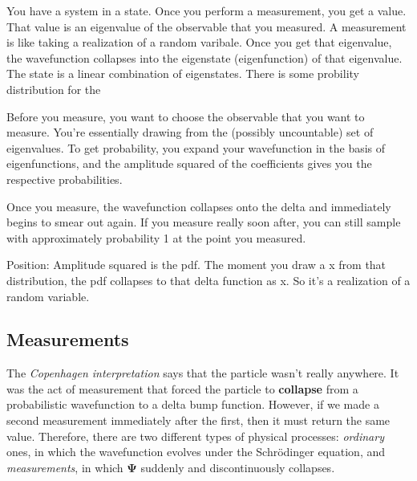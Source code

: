 \documentclass{article}
\theoremstyle{definition}
\begin{document}
      You have a system in a state. Once you perform a measurement, you get a value. That value is an eigenvalue of the observable that you measured. A measurement is like taking a realization of a random varibale. Once you get that eigenvalue, the wavefunction collapses into the eigenstate (eigenfunction) of that eigenvalue. The state is a linear combination of eigenstates. There is some probility distribution for the 

      Before you measure, you want to choose the observable that you want to measure. You're essentially drawing from the (possibly uncountable) set of eigenvalues. To get probability, you expand your wavefunction in the basis of eigenfunctions, and the amplitude squared of the  coefficients gives you the respective probabilities. 

      Once you measure, the wavefunction collapses onto the delta and immediately begins to smear out again. If you measure really soon after, you can still sample with approximately probability 1 at the point you measured. 

      Position: Amplitude squared is the pdf. The moment you draw a x from that distribution, the pdf collapses to that delta function as x. So it's a realization of a random variable. 
      

  \subsection{Measurements}

  The \textit{Copenhagen interpretation} says that the particle wasn't really anywhere. It was the act of measurement that forced the particle to \textbf{collapse} from a probabilistic wavefunction to a delta bump function. However, if we made a second measurement immediately after the first, then it must return the same value. Therefore, there are two different types of physical processes: \textit{ordinary} ones, in which the wavefunction evolves under the Schr\"odinger equation, and \textit{measurements}, in which $\boldsymbol{\Psi}$ suddenly and discontinuously collapses. 
\end{document}
